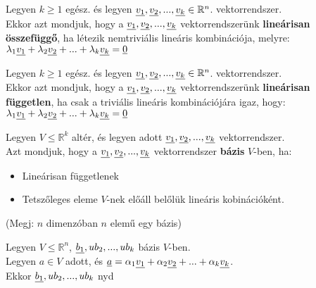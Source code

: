 	\begin{frame}
	\begin{tcolorbox}[title={Def.: Lineáris összefüggőség}]
			Legyen $k \geq 1$ egész. és legyen $\underline{v_1}, \underline{v_2}, ..., \underline{v_k} \in \mathbb{R}^n$. vektorrendszer.\\
			Ekkor azt mondjuk, hogy a $\underline{v_1}, \underline{v_2}, ..., \underline{v_k}$ vektorrendszerünk \textbf{lineárisan összefüggő}, ha létezik nemtriviális lineáris kombinációja, melyre:\\
			${\lambda}_1\underline{v_1} + {\lambda}_2\underline{v_2} + ... + {\lambda}_k\underline{v_k} = \underline{0}$
		\end{tcolorbox}
		
		\begin{tcolorbox}[title={Def.: Lineáris függetlenség}]
			Legyen $k \geq 1$ egész. és legyen $\underline{v_1}, \underline{v_2}, ..., \underline{v_k} \in \mathbb{R}^n$. vektorrendszer.\\
			Ekkor azt mondjuk, hogy a $\underline{v_1}, \underline{v_2}, ..., \underline{v_k}$ vektorrendszerünk \textbf{lineárisan független}, ha csak a triviális lineáris kombinációjára igaz, hogy:\\
			${\lambda}_1\underline{v_1} + {\lambda}_2\underline{v_2} + ... + {\lambda}_k\underline{v_k} = \underline{0}$
		\end{tcolorbox}
		
		\begin{tcolorbox}[title={Def.: Bázis}]
			Legyen $ V \leq \mathbb{R}^k$ altér, és legyen adott $\underline{v_1}, \underline{v_2}, ..., \underline{v_k}$ vektorrendszer.\\
			Azt mondjuk, hogy a $\underline{v_1}, \underline{v_2}, ..., \underline{v_k}$ vektorrendszer \textbf{bázis} $V$-ben, ha:\\
			\begin{itemize}
				\item Lineárisan függetlenek
				\item Tetszőleges eleme $V$-nek előáll belőlük lineáris kobinációként.
			\end{itemize}
			\mmedskip
			
			 (Megj:   $n$ dimenzóban $n$ elemű egy bázis)
		\end{tcolorbox}
		
	\end{frame}
	
	\begin{frame}
		\begin{tcolorbox}[title={Tétel.: Bázistransformáció}]
			Legyen $V \leq \mathbb{R}^n$, $\underline{b_1}, u{b_2}, ..., u{b_k}$ bázis $V$-ben.\\
			Legyen $a \in V$ adott, és $\underline{a} = {\alpha}_1\underline{v_1} +  {\alpha}_2\underline{v_2} +  ... + {\alpha}_k\underline{v_k}$.\\
			Ekkor $\underline{b_1}, u{b_2}, ..., u{b_k}$ nyd
		\end{tcolorbox}
	\end{frame}


